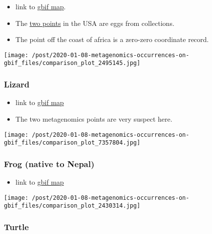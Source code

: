 \documentclass[]{article}
\providecommand{\tightlist}{%
  \setlength{\itemsep}{0pt}\setlength{\parskip}{0pt}}
\begin{document}
\begin{itemize}
\tightlist
\item
  link to
  \href{https://www.gbif.org/occurrence/map?taxon_key=2495145}{gbif
  map}.
\item
  The
  \href{https://www.gbif.org/occurrence/search?has_coordinate=true\&taxon_key=2495145\&advanced=1\&geometry=POLYGON((-120.67383\%2020.03906,-75.49805\%2020.03906,-75.49805\%2037.61719,-120.67383\%2037.61719,-120.67383\%2020.03906))}{two
  points} in the USA are eggs from collections.
\item
  The point off the coast of africa is a zero-zero coordinate record.
\end{itemize}

\texttt{[image: /post/2020-01-08-metagenomics-occurrences-on-gbif\_files/comparison\_plot\_2495145.jpg]}

\hypertarget{lizard}{%
\subsubsection{Lizard}\label{lizard}}

\begin{itemize}
\tightlist
\item
  link to
  \href{https://www.gbif.org/occurrence/map?taxon_key=7357804}{gbif map}
\item
  The two {metagenomics points} are very suspect here.
\end{itemize}

\texttt{[image: /post/2020-01-08-metagenomics-occurrences-on-gbif\_files/comparison\_plot\_7357804.jpg]}

\hypertarget{frog-native-to-nepal}{%
\subsubsection{Frog (native to Nepal)}\label{frog-native-to-nepal}}

\begin{itemize}
\tightlist
\item
  link to
  \href{https://www.gbif.org/occurrence/map?taxon_key=2430314}{gbif map}
\end{itemize}

\texttt{[image: /post/2020-01-08-metagenomics-occurrences-on-gbif\_files/comparison\_plot\_2430314.jpg]}

\hypertarget{turtle}{%
\subsubsection{Turtle}\label{turtle}}
\end{document}
